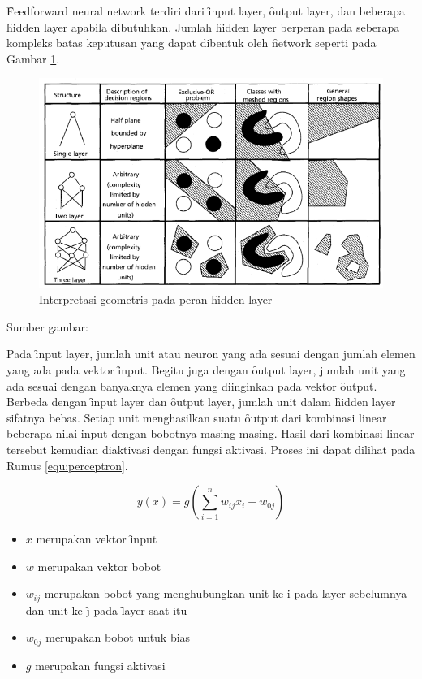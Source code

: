 \f{Feedforward neural network} terdiri dari \f{input layer}, \f{output layer}, dan beberapa \f{hidden layer} apabila dibutuhkan. Jumlah \f{hidden layer} berperan pada seberapa kompleks batas keputusan yang dapat dibentuk oleh \f{network} seperti pada Gambar \ref{fig:hl}.

\begin{figure}
	\centering
	\includegraphics[width=1\textwidth,height=0.6\textwidth]
	{pics/hl.png}
	\caption{Interpretasi geometris pada peran \f{hidden layer}}
	\label{fig:hl}
\end{figure}
\vspace{-1.2cm}
\begin{center}
	{\small Sumber gambar: \cite{paper.jain}}
\end{center}

Pada \f{input layer}, jumlah unit atau neuron yang ada sesuai dengan jumlah elemen yang ada pada vektor \f{input}. Begitu juga dengan \f{output layer}, jumlah unit yang ada sesuai dengan banyaknya elemen yang diinginkan pada vektor \f{output}. Berbeda dengan \f{input layer} dan \f{output layer}, jumlah unit dalam \f{hidden layer} sifatnya bebas. Setiap unit menghasilkan suatu \f{output} dari kombinasi linear beberapa nilai \f{input} dengan bobotnya masing-masing. Hasil dari kombinasi linear tersebut kemudian diaktivasi dengan fungsi aktivasi. Proses ini dapat dilihat pada Rumus \ref{equ:perceptron}.

\begin{equation}
\label{equ:perceptron}
y(x) = g\left(\sum\limits_{i=1}^{n} w_{ij}x_{i} + w_{0j}\right)
\end{equation}

\begin{itemize}
	\item $x$ merupakan vektor \f{input}
	\item $w$ merupakan vektor bobot
	\item $w_{ij}$ merupakan bobot yang menghubungkan unit ke-\f{i} pada \f{layer} sebelumnya dan unit ke-\f{j} pada \f{layer} saat itu
	\item $w_{0j}$ merupakan bobot untuk bias
	\item $g$ merupakan fungsi aktivasi
\end{itemize}

